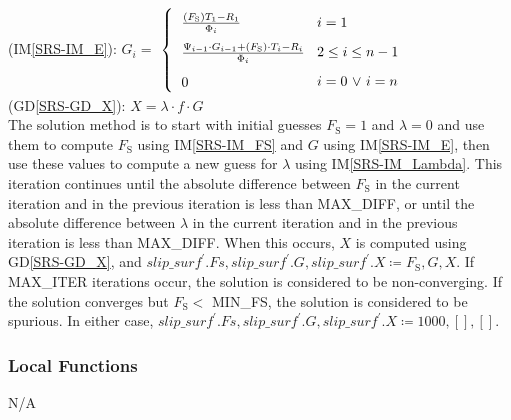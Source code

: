 \documentclass[12pt, titlepage]{article}
\newcommand{\iref}[1]{IM\ref{#1}}
\newcommand{\dref}[1]{GD\ref{#1}}
\begin{document}
\begin{itemize}
\begin{itemize}
		(\iref{SRS-IM_E}): \( G_{i}= \) 
		\(  \left\{
		\renewcommand{\arraystretch}{1.75}
		\begin{tabular}{ p{3cm} l} 
		$ \frac{ \left(F_\text{S}\right) T_{\text{1}} - R_{\text{1}} }{
			\Phi_{i} } $ &  $i=1$ \\
		\noindent\parbox[c]{\hsize} {$ \frac{ \Psi_{i-1} \cdot
				G_{i-1} + \left(F_\text{S}\right) \cdot T_{i} -
				R_{i} }{ \Phi_{i} } $} & 
		$2\leq i \leq n-1$ \\
		\noindent\parbox[c]{\hsize} {$0 $} &  $i=0$ $\lor$ $i=n$
		\end{tabular}
		\renewcommand{\arraystretch}{1}
		\right. \) \\
		
		(\dref{SRS-GD_X}): \( X = \lambda \cdot f \cdot G \) \\
		
		The solution method is to start with initial guesses $F_\text{S} = 1$ 
		and $\lambda = 0$ and use them to compute $F_\text{S}$ using 
		\iref{SRS-IM_FS} and $G$ using \iref{SRS-IM_E}, then use these values 
		to compute a new guess for $\lambda$ using \iref{SRS-IM_Lambda}. This 
		iteration continues until the absolute difference between $F_\text{S}$ 
		in the current iteration and in the previous iteration is less than 
		MAX\_DIFF, or until the absolute difference between $\lambda$ in the 
		current iteration and in the previous iteration is less than MAX\_DIFF. 
		When this occurs, $X$ is computed using \dref{SRS-GD_X}, and 
		$\textit{slip\_surf}^\prime.Fs, \textit{slip\_surf}^\prime.G, 
		\textit{slip\_surf}^\prime.X \coloneqq F_\text{S}, G, X$.
		If MAX\_ITER iterations occur, the solution is considered to be 
		non-converging. If the solution converges but $F_\text{S} <$ 
		MIN\_FS, the solution is considered to be spurious. In either case, 
		$\textit{slip\_surf}^\prime.Fs, \textit{slip\_surf}^\prime.G, 
		\textit{slip\_surf}^\prime.X \coloneqq 1000, [], []$.
	\end{itemize}
\end{itemize}


\subsubsection{Local Functions}
N/A

\newpage
\end{document}
